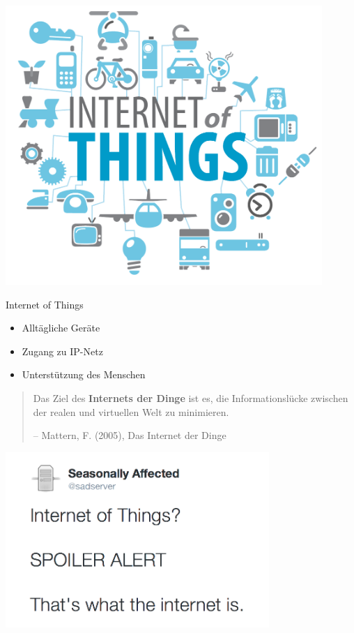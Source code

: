 \begin{frame}[fragile]
  \begin{center}
    \includegraphics[width=0.9\textwidth]{images/iot}
    \label{fig:iot}
  \end{center}
\end{frame}

\begin{frame}{Internet of Things}
  \Large
  \begin{itemize}
    \item Alltägliche Geräte
    \item Zugang zu IP-Netz
    \item Unterstützung des Menschen
  \end{itemize}

  \vspace{0.5cm}

  \begin{quote}
    \normalsize
    Das Ziel des \textbf{Internets der Dinge} ist es, die Informationslücke
    zwischen der realen und virtuellen Welt zu minimieren.
    \begin{flushright}
      \small
      -- Mattern, F. (2005), Das Internet der Dinge
    \end{flushright}
  \end{quote}
\end{frame}

\begin{frame}[fragile]
  \begin{center}
    \includegraphics[width=0.75\textwidth]{images/sadserver1}
    \label{fig:spoiler}
  \end{center}
\end{frame}